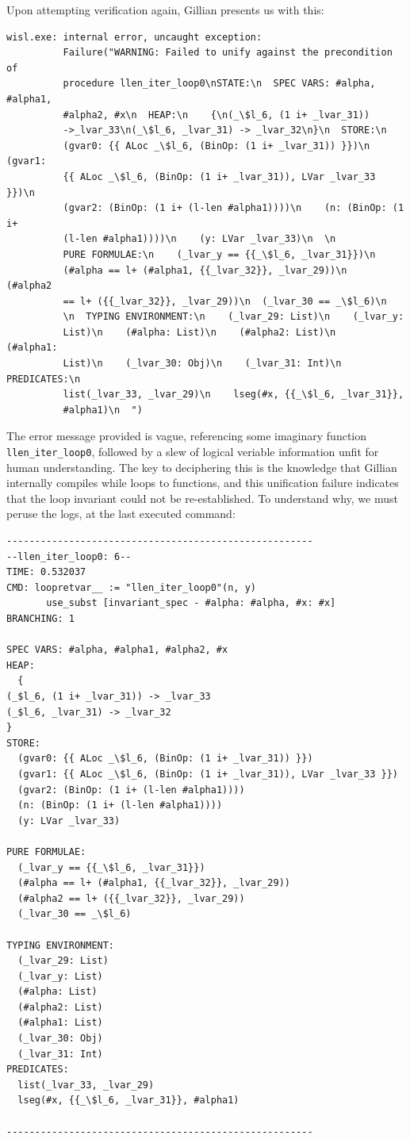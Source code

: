 Upon attempting verification again, Gillian presents us with this:
\begin{lstlisting}[style=code, numbers=none, caption={Verification: WISL list length error - precondition not met}]
wisl.exe: internal error, uncaught exception:
          Failure("WARNING: Failed to unify against the precondition of
          procedure llen_iter_loop0\nSTATE:\n  SPEC VARS: #alpha, #alpha1,
          #alpha2, #x\n  HEAP:\n    {\n(_\$l_6, (1 i+ _lvar_31))
          ->_lvar_33\n(_\$l_6, _lvar_31) -> _lvar_32\n}\n  STORE:\n    
          (gvar0: {{ ALoc _\$l_6, (BinOp: (1 i+ _lvar_31)) }})\n    (gvar1:
          {{ ALoc _\$l_6, (BinOp: (1 i+ _lvar_31)), LVar _lvar_33 }})\n    
          (gvar2: (BinOp: (1 i+ (l-len #alpha1))))\n    (n: (BinOp: (1 i+
          (l-len #alpha1))))\n    (y: LVar _lvar_33)\n  \n  
          PURE FORMULAE:\n    (_lvar_y == {{_\$l_6, _lvar_31}})\n    
          (#alpha == l+ (#alpha1, {{_lvar_32}}, _lvar_29))\n    (#alpha2 
          == l+ ({{_lvar_32}}, _lvar_29))\n  (_lvar_30 == _\$l_6)\n  
          \n  TYPING ENVIRONMENT:\n    (_lvar_29: List)\n    (_lvar_y:
          List)\n    (#alpha: List)\n    (#alpha2: List)\n    (#alpha1:
          List)\n    (_lvar_30: Obj)\n    (_lvar_31: Int)\n  PREDICATES:\n    
          list(_lvar_33, _lvar_29)\n    lseg(#x, {{_\$l_6, _lvar_31}}, 
          #alpha1)\n  ")
\end{lstlisting}

The error message provided is vague, referencing some imaginary function
\texttt{llen\_iter\_loop0}, followed by a slew of logical veriable information
unfit for human understanding. The key to deciphering this is the knowledge that
Gillian internally compiles while loops to functions, and this unification
failure indicates that the loop invariant could not be re-established. To
understand why, we must peruse the logs, at the last executed command:
\begin{lstlisting}[style=code, numbers=none, caption={Loop invariant failure - Gillian log file}]
------------------------------------------------------
--llen_iter_loop0: 6--
TIME: 0.532037
CMD: loopretvar__ := "llen_iter_loop0"(n, y) 
       use_subst [invariant_spec - #alpha: #alpha, #x: #x]
BRANCHING: 1

SPEC VARS: #alpha, #alpha1, #alpha2, #x
HEAP:
  {
(_$l_6, (1 i+ _lvar_31)) -> _lvar_33
(_$l_6, _lvar_31) -> _lvar_32
}
STORE:
  (gvar0: {{ ALoc _\$l_6, (BinOp: (1 i+ _lvar_31)) }})
  (gvar1: {{ ALoc _\$l_6, (BinOp: (1 i+ _lvar_31)), LVar _lvar_33 }})
  (gvar2: (BinOp: (1 i+ (l-len #alpha1))))
  (n: (BinOp: (1 i+ (l-len #alpha1))))
  (y: LVar _lvar_33)

PURE FORMULAE:
  (_lvar_y == {{_\$l_6, _lvar_31}})
  (#alpha == l+ (#alpha1, {{_lvar_32}}, _lvar_29))
  (#alpha2 == l+ ({{_lvar_32}}, _lvar_29))
  (_lvar_30 == _\$l_6)

TYPING ENVIRONMENT:
  (_lvar_29: List)
  (_lvar_y: List)
  (#alpha: List)
  (#alpha2: List)
  (#alpha1: List)
  (_lvar_30: Obj)
  (_lvar_31: Int)
PREDICATES:
  list(_lvar_33, _lvar_29)
  lseg(#x, {{_\$l_6, _lvar_31}}, #alpha1)

------------------------------------------------------
\end{lstlisting}


